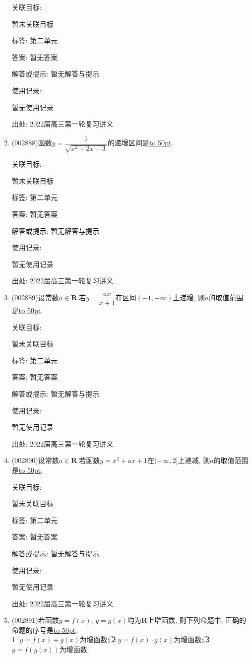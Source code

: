 \documentclass[10pt,a4paper]{article}
\newcommand{\blank}[1]{\underline{\hbox to #1pt{}}}
\begin{document}
\begin{enumerate}[1.]
关联目标:

暂未关联目标



标签: 第二单元

答案: 暂无答案

解答或提示: 暂无解答与提示

使用记录:

暂无使用记录


出处: 2022届高三第一轮复习讲义
\item { (002888)}函数$y=\dfrac 1{\sqrt{x^2+2x-3}}$的递增区间是\blank{50}.


关联目标:

暂未关联目标



标签: 第二单元

答案: 暂无答案

解答或提示: 暂无解答与提示

使用记录:

暂无使用记录


出处: 2022届高三第一轮复习讲义
\item { (002889)}设常数$a\in \mathbf{R}$.若$y=\dfrac{ax}{x+1}$在区间$(-1,+\infty)$上递增, 则$a$的取值范围是\blank{50}.


关联目标:

暂未关联目标



标签: 第二单元

答案: 暂无答案

解答或提示: 暂无解答与提示

使用记录:

暂无使用记录


出处: 2022届高三第一轮复习讲义
\item { (002890)}设常数$a\in \mathbf{R}$.若函数$y=x^2+ax+1$在$(-\infty,2]$上递减, 则$a$的取值范围是\blank{50}.


关联目标:

暂未关联目标



标签: 第二单元

答案: 暂无答案

解答或提示: 暂无解答与提示

使用记录:

暂无使用记录


出处: 2022届高三第一轮复习讲义
\item { (002891)}若函数$y=f(x)$, $y=g(x)$均为$\mathbf{R}$上增函数, 则下列命题中, 正确的命题的序号是\blank{50}.\\
\textcircled{1} $y=f(x)+g(x)$为增函数; \textcircled{2} $y=f(x)\cdot g(x)$为增函数; \textcircled{3} $y=f(g(x))$为增函数.



\end{enumerate}
\end{document}
